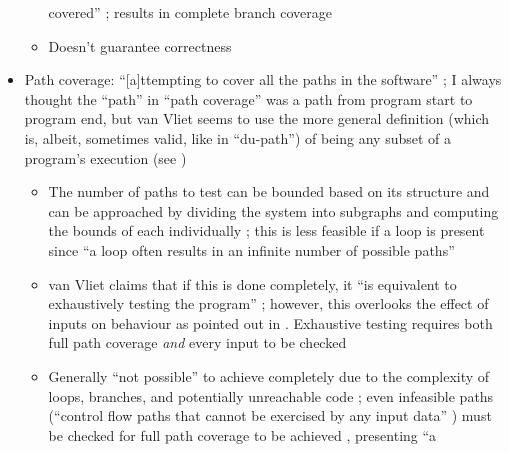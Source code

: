 \begin{itemize}
\begin{itemize}
                    covered'' \citep[p.~423]{vanVliet2000};
                    results in complete branch coverage
              \item Doesn't guarantee correctness
                    \citep[p.~421]{vanVliet2000}
          \end{itemize}
    \item Path coverage: ``[a]ttempting to cover all the paths in the
          software'' \citep[p.~119]{Patton2006};
          I always thought the ``path'' in ``path coverage'' was
          a path from program start to program end, but van
          Vliet seems to use the more general definition (which
          is, albeit, sometimes valid, like in ``du-path'') of
          being any subset of a program's execution (see
          \citep[p.~420]{vanVliet2000})
          \begin{itemize}
              \item The number of paths to test can be bounded based on its
                    structure and can be approached by dividing the system
                    into subgraphs and computing the bounds of each
                    individually \citep[pp.~471-473]{PetersAndPedrycz2000};
                    this is less feasible if a loop is present
                    \citep[pp.~473-476]{PetersAndPedrycz2000} since ``a loop
                    often results in an infinite number of possible paths''
                    \citep[p.~421]{vanVliet2000}
              \item van Vliet claims that if this is done completely, it
                    ``is equivalent to exhaustively testing the program''
                    \citep[p.~421]{vanVliet2000};
                    however, this overlooks the effect of inputs on
                    behaviour as pointed out in
                    \citep[pp.~466-467]{PetersAndPedrycz2000}. Exhaustive
                    testing requires both full path coverage \emph{and}
                    every input to be checked
              \item Generally ``not possible'' to achieve completely due to
                    the complexity of
                    loops, branches, and potentially unreachable code
                    \citep[p.~421]{vanVliet2000}; even infeasible
                    paths (``control flow paths that cannot be exercised by
                    any input data'' \citep[p.~5-5]{SWEBOK2024}) must be
                    checked for full path coverage to be achieved
                    \citep[p.~439]{PetersAndPedrycz2000}, presenting ``a

\end{itemize}
\end{itemize}
